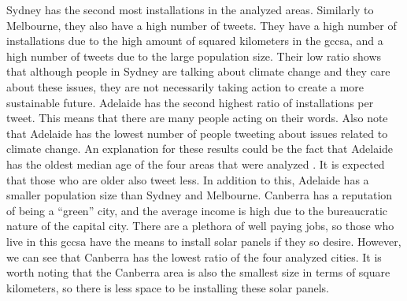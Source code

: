 \documentclass[11pt, oneside]{article}
\begin{document}
Sydney has the second most installations in the analyzed areas. Similarly to Melbourne, they also have a high number of tweets. They have a high number of installations due to the high amount of squared kilometers in the \acrlong{gccsa}, and a high number of tweets due to the large population size. Their low ratio shows that although people in Sydney are talking about climate change and they care about these issues, they are not necessarily taking action to create a more sustainable future.
\newline
\newline
Adelaide has the second highest ratio of installations per tweet. This means that there are many people acting on their words. Also note that Adelaide has the lowest number of people tweeting about issues related to climate change. An explanation for these results could be the fact that Adelaide has the oldest median age of the four areas that were analyzed \citep{age_statistics}. It is expected that those who are older also tweet less. In addition to this, Adelaide has a smaller population size than Sydney and Melbourne.
\newline
\newline
Canberra has a reputation of being a \enquote{green} city, and the average income is high due to the bureaucratic nature of the capital city. There are a plethora of well paying jobs, so those who live in this \acrlong{gccsa} have the means to install solar panels if they so desire. However, we can see that Canberra has the lowest ratio of the four analyzed cities. It is worth noting that the Canberra area is also the smallest size in terms of square kilometers, so there is less space to be installing these solar panels.
\newpage


\printbibliography[heading=bibintoc]
\end{document}

